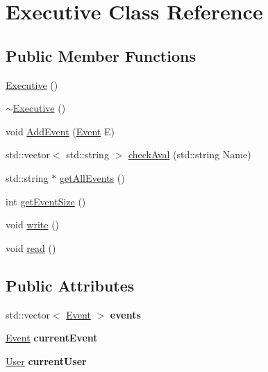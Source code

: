\hypertarget{class_executive}{}\section{Executive Class Reference}
\label{class_executive}
\subsection*{Public Member Functions}
\begin{DoxyCompactItemize}
\item 
\mbox{\hyperlink{class_executive_ad870c1d741f1f313eb0c5a8336f8af6b}{Executive}} ()
\item 
\mbox{\hyperlink{class_executive_a4ce80c499f7640b1770ade77cf56d965}{$\sim$\+Executive}} ()
\item 
void \mbox{\hyperlink{class_executive_aa6ef4869740ffb4ad00da8e03524b757}{Add\+Event}} (\mbox{\hyperlink{class_event}{Event}} E)
\item 
std\+::vector$<$ std\+::string $>$ \mbox{\hyperlink{class_executive_a4099c9d7fba8038ef79df8daddf60f1e}{check\+Aval}} (std\+::string Name)
\item 
std\+::string $\ast$ \mbox{\hyperlink{class_executive_ada44e998fdc559eba9db2f4edeef0978}{get\+All\+Events}} ()
\item 
int \mbox{\hyperlink{class_executive_a325d611b8cd579647ee657c69560f28a}{get\+Event\+Size}} ()
\item 
void \mbox{\hyperlink{class_executive_a49841644378cd9bb4b8c1cc2eee04003}{write}} ()
\item 
void \mbox{\hyperlink{class_executive_a222ab3a86234f7476e769a285bf566a4}{read}} ()
\end{DoxyCompactItemize}
\subsection*{Public Attributes}
\begin{DoxyCompactItemize}
\item 
\mbox{\label{class_executive_a63df728eed3bdfd798e943d41d052f2d}} 
std\+::vector$<$ \mbox{\hyperlink{class_event}{Event}} $>$ {\bfseries events}
\item 
\mbox{\label{class_executive_afc5d32a44263c70d0795765fc238b343}} 
\mbox{\hyperlink{class_event}{Event}} {\bfseries current\+Event}
\item 
\mbox{\label{class_executive_a6396a22945149d9e698ac1e5d8312d93}} 
\mbox{\hyperlink{class_user}{User}} {\bfseries current\+User}
\end{DoxyCompactItemize}


